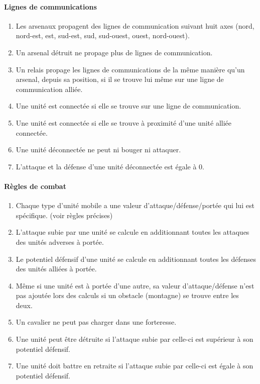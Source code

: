 		\paragraph{Lignes de communications}
		\begin{enumerate}
		\item Les arsenaux propagent des lignes de communication suivant huit axes (nord, nord-est, est, sud-est, sud, sud-ouest, ouest, nord-ouest).
		\item Un arsenal détruit ne propage plus de lignes de communication.
		\item Un relais propage les lignes de communications de la même manière qu'un arsenal, depuis sa position, si il se trouve lui même sur une ligne de communication alliée.
		\item Une unité est connectée si elle se trouve sur une ligne de communication.
		\item Une unité est connectée si elle se trouve à proximité d'une unité alliée connectée.
		\item Une unité déconnectée ne peut ni bouger ni attaquer.
		\item L'attaque et la défense d'une unité déconnectée est égale à 0.
		\end{enumerate}
		
		\paragraph{Règles de combat}
		\begin{enumerate}
		\item Chaque type d'unité mobile a une valeur d'attaque/défense/portée qui lui est spécifique. (voir règles précises)
		\item L'attaque subie par une unité se calcule en additionnant toutes les attaques des unités adverses à portée.
		\item Le potentiel défensif d'une unité se calcule en additionnant toutes les défenses des unités alliées à portée.
		\item Même si une unité est à portée d'une autre, sa valeur d'attaque/défense n'est pas ajoutée lors des calculs si un obstacle (montagne) se trouve entre les deux.
		\item Un cavalier ne peut pas charger dans une forteresse.
		\item Une unité peut être détruite si l'attaque subie par celle-ci est supérieur à son potentiel défensif.
		\item Une unité doit battre en retraite si l'attaque subie par celle-ci est égale à son potentiel défensif.
		\end{enumerate}
		
